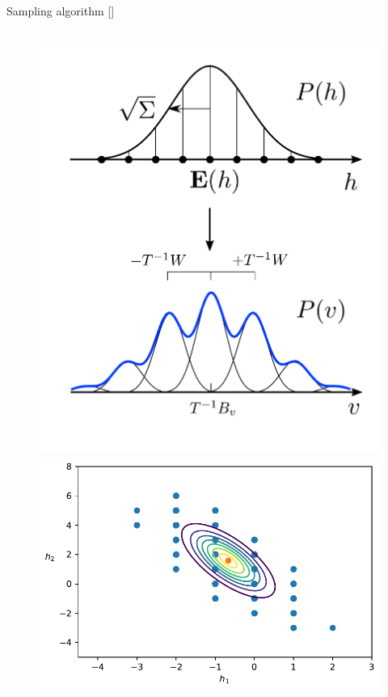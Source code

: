 \documentclass[10pt]{beamer}
\begin{document}
\begin{frame}{Sampling algorithm \hfill \small [\cite{Carrazza:2018nmd}]}
\begin{columns}
\begin{column}[]{0.4 \textwidth}
\begin{figure}[t!]
\begin{center}
                \includegraphics[scale=0.25]{figures/interpretation.pdf}
                \includegraphics[scale=0.25]{figures/radius_interpretation.pdf}
        

\end{center}
\end{figure}
\end{column}
\end{columns}
\end{frame}
\end{document}

